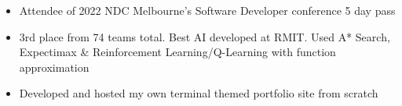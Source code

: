 %
%
%

\twocolumnsection
{
\begin{skills}
\end{skills}}
{
\vspace{1em}
\begin{itemize}
	\item Attendee of 2022 NDC Melbourne's Software Developer conference 5 day pass
	\item 3rd place from 74 teams total. Best AI developed at RMIT. Used A* Search, Expectimax \& Reinforcement Learning/Q-Learning with function approximation
    \item Developed and hosted my own terminal themed portfolio site from scratch
\end{itemize}
}
